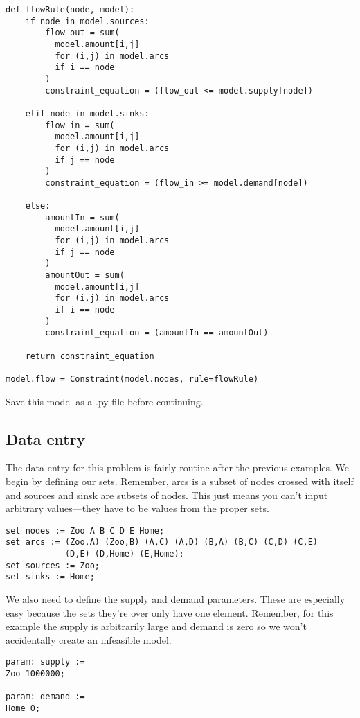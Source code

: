 \documentclass{article}
\begin{document}
\begin{verbatim}
def flowRule(node, model):
    if node in model.sources:
        flow_out = sum(
          model.amount[i,j] 
          for (i,j) in model.arcs 
          if i == node
        )
        constraint_equation = (flow_out <= model.supply[node])
    
    elif node in model.sinks:
        flow_in = sum(
          model.amount[i,j]
          for (i,j) in model.arcs
          if j == node
        )
        constraint_equation = (flow_in >= model.demand[node])
    
    else:
        amountIn = sum(
          model.amount[i,j] 
          for (i,j) in model.arcs 
          if j == node
        )
        amountOut = sum(
          model.amount[i,j] 
          for (i,j) in model.arcs 
          if i == node
        )
        constraint_equation = (amountIn == amountOut)
        
    return constraint_equation
    
model.flow = Constraint(model.nodes, rule=flowRule)
\end{verbatim}

Save this model as a .py file before continuing.

\subsection*{Data entry}

The data entry for this problem is fairly routine after the previous examples.  We begin by defining our sets.  Remember, arcs is a subset of nodes crossed with itself and sources and sinsk are subsets of nodes.  This just means you can't input arbitrary values---they have to be values from the proper sets.

\begin{verbatim}
set nodes := Zoo A B C D E Home;
set arcs := (Zoo,A) (Zoo,B) (A,C) (A,D) (B,A) (B,C) (C,D) (C,E) 
            (D,E) (D,Home) (E,Home);
set sources := Zoo;
set sinks := Home;
\end{verbatim}

We also need to define the supply and demand parameters.  These are especially easy because the sets they're over only have one element.  Remember, for this example the supply is arbitrarily large and demand is zero so we won't accidentally create an infeasible model.

\begin{verbatim}
param: supply :=
Zoo 1000000;

param: demand :=
Home 0;
\end{verbatim}
\end{document}
